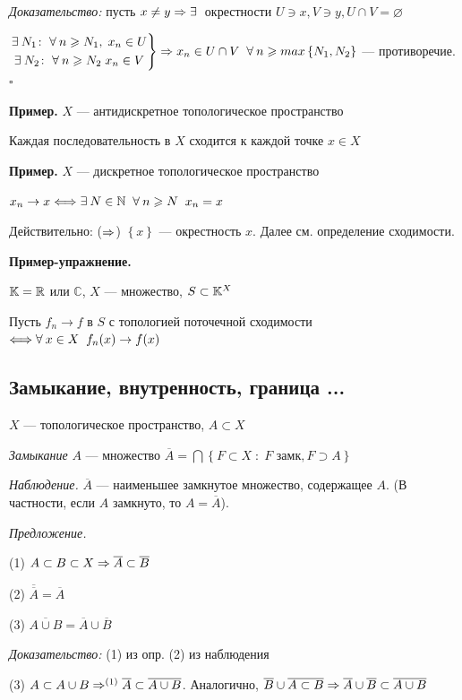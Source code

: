\documentclass[../../main.tex]{subfiles}
\begin{document}
\textit{Доказательство:} пусть $x \neq y \Rightarrow \exists\:$ окрестности $U \ni x, V \ni y, U \cap V = \varnothing$

$\left.
\begin{gathered}
\exists\: N_1 \colon \; \forall\: n \geqslant N_1,\; x_n \in U  \\
\exists\: N_2 \colon \; \forall\: n \geqslant N_2 \; x_n \in V 
\end{gathered}
\right\}  
\Rightarrow x_n \in U \cap V\;\; \forall\: n \geqslant max\left\{N_1, N_2 \right\}  $ — противоречие. $\square$

\textbf{Пример.} $X$ — антидискретное топологическое пространство

Каждая последовательность в $X$ сходится к каждой точке $x \in X$

\textbf{Пример.} $X$ — дискретное топологическое пространство

$x_n \to x \Longleftrightarrow \exists\: N \in \mathbb{N} \;\; \forall\: n \geqslant N \;\; x_n = x$

Действительно: ($\Rightarrow$) $\left\{x \right\}$ — окрестность $x$. Далее см. определение сходимости.

\textbf{Пример-упражнение.}

$\mathbb{K} = \mathbb{R}$ или $\mathbb{C}$, $X$ — множество, $S \subset \mathbb{K}^X$

Пусть $f_n \to f$ в $S$ с топологией поточечной сходимости $\Longleftrightarrow \forall\: x \in X \;\; f_n(x) \to f(x)$

\subsection{Замыкание, внутренность, граница ...}

$X$ — топологическое пространство, $A \subset X$

 \textit{Замыкание} $A$ — множество $\overline{A} = \bigcap \left\{F \subset X\; \colon\; F \text{ замк}, F \supset A \right\}$

\textit{Наблюдение.} $\overline{A}$ — наименьшее замкнутое множество, содержащее $A$. (В частности, если $A$ замкнуто, то $A = \overline{A}$).

\textit{Предложение.} 

(1) $A \subset B \subset X \Rightarrow \overline{A} \subset \overline{B}$

(2) $\overline{\overline{A}} = \overline{A}$

(3) $\overline{A \cup B} = \overline{A} \cup \overline{B}$

\textit{Доказательство:} (1) из опр. (2) из наблюдения

(3) $A \subset A \cup B \Rightarrow^{(1)} \overline{A} \subset \overline{A \cup B}$. Аналогично, $\overline{B} \cup \overline{A \subset B} \Rightarrow \overline{A} \cup \overline{B} \subset \overline{A \cup B}$
\end{document}
